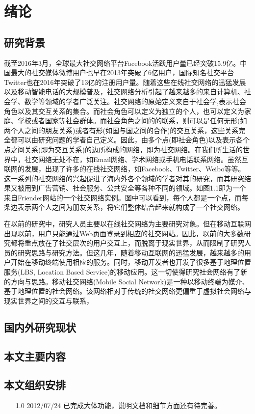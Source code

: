 \chapter{绪论}

\section{研究背景}

\quad 截至2016年3月，全球最大社交网络平台Facebook活跃用户量已经突破15.9亿。中国最大的社交媒体微博用户也早在2013年突破了6亿用户，国际知名社交平台Twitter也在2016年突破了13亿的注册用户量。随着这些在线社交网络的迅猛发展以及移动智能电话的大规模普及，社交网络分析引起了越来越多的来自计算机、社会学、数学等领域的学者广泛关注。社交网络的原始定义\cite{刘军2004社会网络分析导论,ccaggarwalintrosocial}来自于社会学,表示社会角色以及其交互关系的集合。而社会角色可以定义为独立的个人，也可以定义为家庭、学校或者国家等社会群体。而社会角色之间的的联系，则可以是任何无形(如两个人之间的朋友关系)或者有形(如国与国之间的合作)的交互关系，这些关系完全都可以由研究问题的学者自己定义。因此，由多个点(即社会角色)以及表示各个点之间关系(即为交互关系)的边所构成的网络，即为社交网络。在我们所生活的世界中，社交网络无处不在，如Email网络、学术网络或手机电话联系网络。虽然互联网的发展，出现了许多的在线社交网络，如Facebook、Twitter、Weibo等等。这一系列的社交网络的兴起促进了海内外各个领域的学者对其的研究，而其研究结果又被用到广告营销、社会服务、公共安全等各种不同的领域。如图1.1即为一个来自Friender网站的一个社交网络实例。图中可以看到，每个人都是一个点，而每条边表示两个人之间为朋友关系，将它们整体结合起来就构成了一个社交网络。

\quad 在以前的研究中，研究人员主要以在线社交网络为主要研究对象。但在移动互联网出现以前，用户只能通过Web页面登录到相应的社交网站。因此，以前的大多数研究都将重点放在了社交层次的用户交互上，而脱离于现实世界，从而限制了研究人员的研究思路与研究方法。但这几年，随着移动互联网的迅猛发展，越来越多的用户开始在移动终端使用相应的服务。同时，移动开发者也开发了很多基于地理位置服务(LBS, Location Based Service)的移动应用。这一切使得研究社会网络有了新的方向与思路。移动社交网络(Mobile Social Network)是一种以移动终端为媒介、基于地理位置的社会网络。该网络相对于传统的社交网络更偏重于虚拟社会网络与现实世界之间的交互与联系，



\section{国内外研究现状}






\section{本文主要内容}


\section{本文组织安排}
\begin{itemize}
    \item[1.0] 2012/07/24 已完成大体功能，说明文档和细节方面还有待完善。
\end{itemize}

